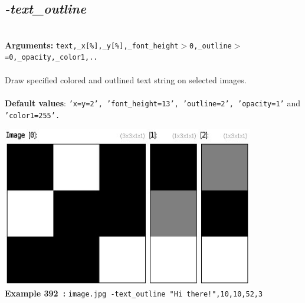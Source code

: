 \documentclass[a4paper,11pt,twoside]{book}
\begin{document}
\subsection{\emph{-text\_outline} }\vspace*{-0.5em}
~\\\textbf{Arguments: } 
{\small \texttt{text,\_x[\%],\_y[\%],\_font\_height$>$0,\_outline$>$=0,\_opacity,\_color1,..}}\\~\\
Draw specified colored and outlined text string on selected images.
~\\~\\\textbf{Default values}: {\small \texttt{'x=y=2', 'font\_height=13', 'outline=2', 'opacity=1'} and \texttt{'color1=255'.}}
\begin{center}\includegraphics[keepaspectratio=true,height=7cm,width=\textwidth]{img/gmic_def392.jpg}\\
{\footnotesize \textbf{Example 392~:} \texttt{image.jpg -text\_outline "Hi there!",10,10,52,3}}
\end{center}
\end{document}
